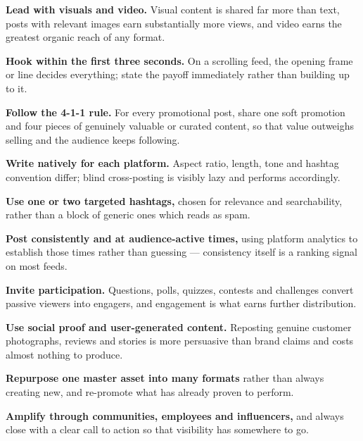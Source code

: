 \begin{qlist}
\begin{apts}
\item \textbf{Lead with visuals and video.} Visual content is shared far more
      than text, posts with relevant images earn substantially more views, and
      video earns the greatest organic reach of any format.
\item \textbf{Hook within the first three seconds.} On a scrolling feed, the
      opening frame or line decides everything; state the payoff immediately
      rather than building up to it.
\item \textbf{Follow the 4-1-1 rule.} For every promotional post, share one soft
      promotion and four pieces of genuinely valuable or curated content, so
      that value outweighs selling and the audience keeps following.
\item \textbf{Write natively for each platform.} Aspect ratio, length, tone and
      hashtag convention differ; blind cross-posting is visibly lazy and
      performs accordingly.
\item \textbf{Use one or two targeted hashtags,} chosen for relevance and
      searchability, rather than a block of generic ones which reads as spam.
\item \textbf{Post consistently and at audience-active times,} using platform
      analytics to establish those times rather than guessing --- consistency
      itself is a ranking signal on most feeds.
\item \textbf{Invite participation.} Questions, polls, quizzes, contests and
      challenges convert passive viewers into engagers, and engagement is what
      earns further distribution.
\item \textbf{Use social proof and user-generated content.} Reposting genuine
      customer photographs, reviews and stories is more persuasive than brand
      claims and costs almost nothing to produce.
\item \textbf{Repurpose one master asset into many formats} rather than always
      creating new, and re-promote what has already proven to perform.
\item \textbf{Amplify through communities, employees and influencers,} and
      always close with a clear call to action so that visibility has somewhere
      to go.
\end{apts}

\end{qlist}
